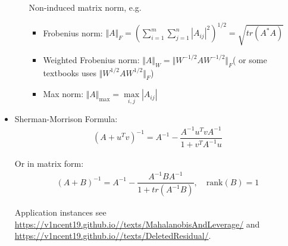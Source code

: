 \begin{itemize}[topsep=6pt,itemsep=4pt]
\begin{itemize}[topsep=2pt,itemsep=0pt]
        Non-induced matrix norm, e.g. 
        \begin{itemize}[topsep=2pt,itemsep=0pt]
            \item Frobenius norm: $ \Vert A \Vert _F=\left(\sum_{i=1}^m\sum_{j=1}^n |A_{ij}|^2 \right)^{1/2} =\sqrt{tr(A^*A)}$
            \item Weighted Frobenius norm: $ \Vert A \Vert _W=\Vert W^{-1/2}AW^{-1/2} \Vert _F $( or some textbooks uses $ \Vert W^{1/2}AW^{1/2} \Vert_F  $)
            \item Max norm: $ \Vert A \Vert_{\max}=\mathop{\max}\limits_{i,j} |A_{ij}|  $
        \end{itemize}
        
        
            
        \end{itemize}
    \item Sherman-Morrison Formula:
    \begin{align}
         \left(A+u^Tv\right)^{-1}=A^{-1}-\dfrac{A^{-1}u^TvA^{-1}}{1+v^TA^{-1}u} 
    \end{align}
    
    Or in matrix form:
    \begin{align}
         \left(A+B\right)^{-1}=A^{-1}-\dfrac{A^{-1}BA^{-1}}{1+tr(A^{-1}B)},\quad \mathrm{rank}(B)=1 
    \end{align}
    
    Application instances see \url{https://v1ncent19.github.io//texts/MahalanobisAndLeverage/} and \url{https://v1ncent19.github.io//texts/DeletedResidual/}.
    
    
    \end{itemize}
    
        


